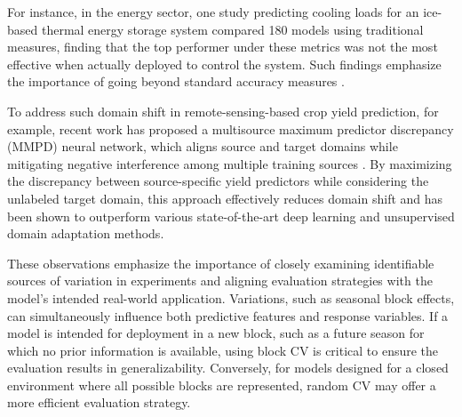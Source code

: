 For instance, in the energy sector, one study predicting cooling loads for an ice-based thermal energy storage system compared 180 models using traditional measures, finding that the top performer under these metrics was not the most effective when actually deployed to control the system. Such findings emphasize the importance of going beyond standard accuracy measures \citep{wang_investigating_2024}. 

To address such domain shift in remote-sensing-based crop yield prediction, for example, recent work has proposed a multisource maximum predictor discrepancy (MMPD) neural network, which aligns source and target domains while mitigating negative interference among multiple training sources \citep{ma_multisource_2023}. By maximizing the discrepancy between source-specific yield predictors while considering the unlabeled target domain, this approach effectively reduces domain shift and has been shown to outperform various state-of-the-art deep learning and unsupervised domain adaptation methods.

These observations emphasize the importance of closely examining identifiable sources of variation in experiments and aligning evaluation strategies with the model’s intended real-world application. Variations, such as seasonal block effects, can simultaneously influence both predictive features and response variables. If a model is intended for deployment in a new block, such as a future season for which no prior information is available, using block CV is critical to ensure the evaluation results in generalizability. Conversely, for models designed for a closed environment where all possible blocks are represented, random CV may offer a more efficient evaluation strategy.
